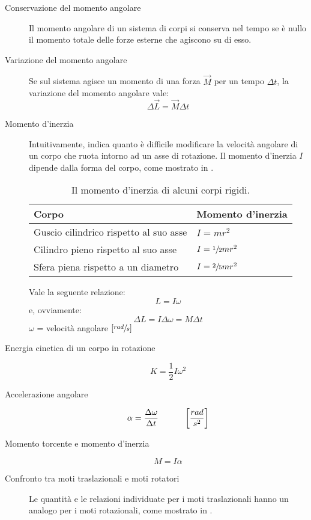\documentclass[a4paper,11pt,italian]{article}
\begin{document}
\begin{description}
  \item[Conservazione del momento angolare] 
  Il momento angolare di un sistema di corpi si conserva nel tempo se è nullo il momento totale delle forze esterne che agiscono su di esso.
  
  \item[Variazione del momento angolare] 
  Se sul sistema agisce un momento di una forza $ \vec{M} $ per un tempo $ \Delta t $, la variazione del momento angolare vale:
  \[ \Delta \vec{L} = \vec{M}\Delta t \]
  
  \item[Momento d'inerzia] 
  Intuitivamente, indica quanto è difficile modificare la velocità angolare di un corpo che ruota intorno ad un asse di rotazione. 
  Il momento d'inerzia $ I $ dipende dalla forma del corpo, come mostrato in .
  
  \begin{table}[htp]\centering
    \begin{tabular}{ll}\toprule
     \textbf{Corpo} & \textbf{Momento d'inerzia} \\\midrule
     Guscio cilindrico rispetto al suo asse & $ I = mr^2 $ \\\addlinespace[.2em]
     Cilindro pieno rispetto al suo asse & $ I = \sfrac{1}{2} mr^2 $ \\\addlinespace[.2em]
     Sfera piena rispetto a un diametro & $ I = \sfrac{2}{5} mr^2 $ \\\bottomrule
    \end{tabular}
    \caption{Il momento d'inerzia di alcuni corpi rigidi.}
    \label{tab:momentoinerzia}
  \end{table}
  
  Vale la seguente relazione:
  \[ L = I\omega \]
  e, ovviamente:
  \[ \Delta L = I\Delta\omega = M \Delta t \]
  $ \omega $ = velocità angolare $ [\sfrac{rad}{s}] $
  
  \item[Energia cinetica di un corpo in rotazione]
  \[ K = \frac{1}{2}I\omega^2 \]
  
  \item[Accelerazione angolare]
  \[ \alpha = \frac{\Delta \omega}{\Delta t} \hspace*{3em} \left[ \frac{rad}{s^2} \right] \]
  
  \item[Momento torcente e momento d'inerzia]
  \[ M = I \alpha \]
  
  \item[Confronto tra moti traslazionali e moti rotatori] 
  Le quantità e le relazioni individuate per i moti traslazionali hanno un analogo per i moti rotazionali, come mostrato in .


\end{description}
\end{document}

